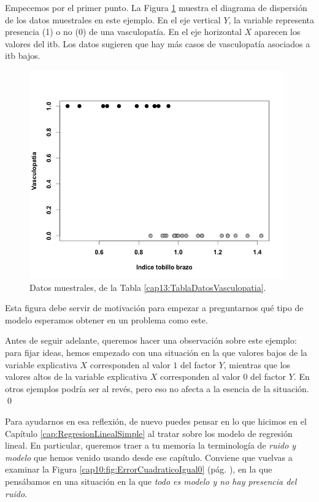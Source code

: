 \begin{ejemplo}
	\label{cap13:ejem:RegresionLogistica01}
	Empecemos por el primer punto. La Figura \ref{cap13:fig:DiagramaDispersionITB} muestra el diagrama de  dispersión de los datos muestrales en este ejemplo. En el eje vertical $Y$, la variable representa presencia (1) o no (0) de una vasculopatía. En el eje horizontal $X$ aparecen los valores del itb. Los datos sugieren que hay más casos de vasculopatía asociados a itb bajos. 	
	\begin{figure}[h!]
		\begin{center}
        \includegraphics[width=11cm]{../fig/Cap13-DiagramaDispersionITB.png}
        \caption{Datos muestrales, de la Tabla \ref{cap13:TablaDatosVasculopatia}. }
		\label{cap13:fig:DiagramaDispersionITB}
		\end{center}
	\end{figure}

	
	Esta figura debe servir de motivación para empezar a preguntarnos qué tipo de modelo esperamos obtener en un problema como este.
	
	Antes de seguir adelante, queremos hacer una observación sobre este ejemplo: para fijar ideas, hemos empezado con una situación en la que valores bajos de la variable explicativa $X$ corresponden al valor $1$ del factor $Y$, mientras que los valores altos de la variable explicativa $X$ corresponden al valor $0$ del factor $Y$. En otros ejemplos podría ser al revés, pero eso no afecta a la esencia de la situación.
	\qed	
\end{ejemplo}


Para ayudarnos en esa reflexión, de nuevo puedes pensar en lo que hicimos en el Capítulo \ref{cap:RegresionLinealSimple} al tratar sobre los modelo de regresión lineal. En particular, queremos traer a tu memoria la terminología de {\em ruido y modelo} que hemos venido usando desde ese capítulo. Conviene que vuelvas a examinar la Figura \ref{cap10:fig:ErrorCuadraticoIgual0} (pág. \pageref{cap10:fig:ErrorCuadraticoIgual0}), en la que pensábamos en una situación en la que {\em todo es modelo y no hay presencia del ruido}.


